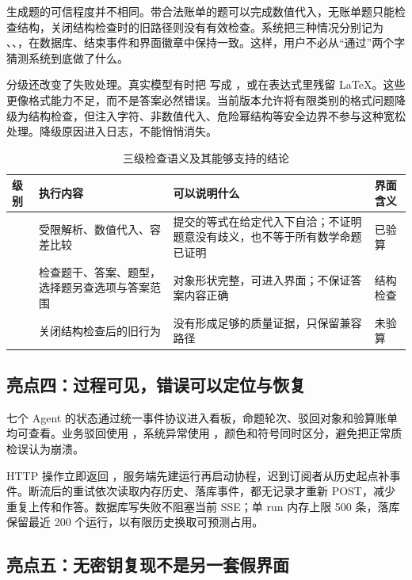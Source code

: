 生成题的可信程度并不相同。带合法账单的题可以完成数值代入，无账单题只能检查结构，关闭结构检查时的旧路径则没有有效检查。系统把三种情况分别记为 、、，在数据库、结束事件和界面徽章中保持一致。这样，用户不必从“通过”两个字猜测系统到底做了什么。

分级还改变了失败处理。真实模型有时把  写成 ，或在表达式里残留 LaTeX。这些更像格式能力不足，而不是答案必然错误。当前版本允许将有限类别的格式问题降级为结构检查，但注入字符、非数值代入、危险幂结构等安全边界不参与这种宽松处理。降级原因进入日志，不能悄悄消失。

\begin{table}[H]
\centering\footnotesize
\caption{三级检查语义及其能够支持的结论}
\begin{tabularx}{\textwidth}{@{}L{2.5cm}L{3.7cm}Y L{2.7cm}@{}}
\toprule
\textbf{级别} & \textbf{执行内容} & \textbf{可以说明什么} & \textbf{界面含义} \\
\midrule
{} & 受限解析、数值代入、容差比较 & 提交的等式在给定代入下自洽；不证明题意没有歧义，也不等于所有数学命题已证明 & 已验算 \\
 & 检查题干、答案、题型，选择题另查选项与答案范围 & 对象形状完整，可进入界面；不保证答案内容正确 & 结构检查 \\
 & 关闭结构检查后的旧行为 & 没有形成足够的质量证据，只保留兼容路径 & 未验算 \\
\bottomrule
\end{tabularx}
\end{table}

\subsection{亮点四：过程可见，错误可以定位与恢复}

七个 Agent 的状态通过统一事件协议进入看板，命题轮次、驳回对象和验算账单均可查看。业务驳回使用 ，系统异常使用 ，颜色和符号同时区分，避免把正常质检误认为崩溃。

HTTP 操作立即返回 ，服务端先建运行再启动协程，迟到订阅者从历史起点补事件。断流后的重试依次读取内存历史、落库事件，都无记录才重新 POST，减少重复上传和作答。数据库写失败不阻塞当前 SSE；单 run 内存上限 500 条，落库保留最近 200 个运行，以有限历史换取可预测占用。

\subsection{亮点五：无密钥复现不是另一套假界面}

